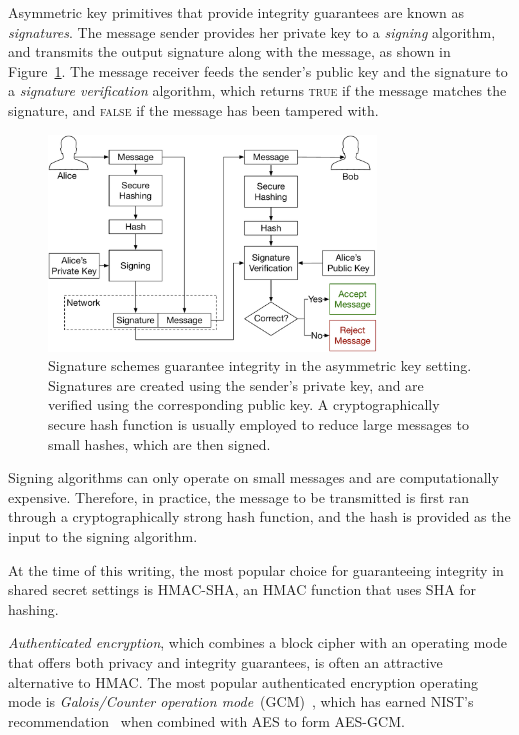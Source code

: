 Asymmetric key primitives that provide integrity guarantees are known as
\textit{signatures}. The message sender provides her private key to a
\textit{signing} algorithm, and transmits the output signature along with the
message, as shown in Figure~\ref{fig:asymmetric_signing}. The message receiver
feeds the sender's public key and the signature to a \textit{signature
verification} algorithm, which returns \textsc{true} if the message matches the
signature, and \textsc{false} if the message has been tampered with.

\begin{figure}[hbt]
  \centering
  \includegraphics[width=87mm]{figures/asymmetric_signing.pdf}
  \caption{
    Signature schemes guarantee integrity in the asymmetric key setting.
    Signatures are created using the sender's private key, and are verified
    using the corresponding public key. A cryptographically secure hash
    function is usually employed to reduce large messages to small hashes,
    which are then signed.
  }
  \label{fig:asymmetric_signing}
\end{figure}

Signing algorithms can only operate on small messages and are computationally
expensive. Therefore, in practice, the message to be transmitted is first ran
through a cryptographically strong hash function, and the hash is provided as
the input to the signing algorithm.

At the time of this writing, the most popular choice for guaranteeing integrity
in shared secret settings is HMAC-SHA, an HMAC function that uses SHA for
hashing.

\textit{Authenticated encryption}, which combines a block cipher with an
operating mode that offers both privacy and integrity guarantees, is often an
attractive alternative to HMAC. The most popular authenticated encryption
operating mode is \textit{Galois/Counter operation
mode}~(GCM)~\cite{mcgrew2004gcm}, which has earned NIST's
recommendation~\cite{fips2017gcm} when combined with AES to form AES-GCM.

